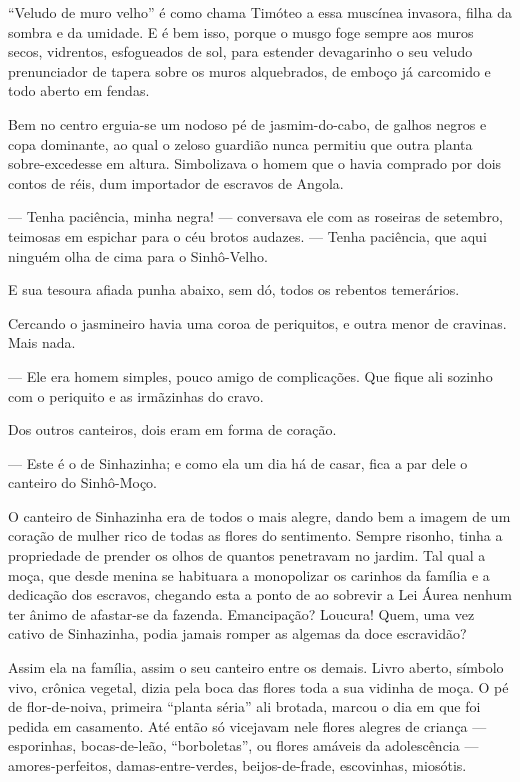 ``Veludo de muro velho'' é como chama Timóteo a essa muscínea invasora,
filha da sombra e da umidade. E é bem isso, porque o musgo foge sempre
aos muros secos, vidrentos, esfogueados de sol, para estender
devagarinho o seu veludo prenunciador de tapera sobre os muros
alquebrados, de emboço já carcomido e todo aberto em fendas.

Bem no centro erguia-se um nodoso pé de jasmim-do-cabo, de galhos negros
e copa dominante, ao qual o zeloso guardião nunca permitiu que outra
planta sobre-excedesse em altura. Simbolizava o homem que o havia
comprado por dois contos de réis, dum importador de escravos de Angola.

--- Tenha paciência, minha negra! --- conversava ele com as roseiras de
setembro, teimosas em espichar para o céu brotos audazes. --- Tenha
paciência, que aqui ninguém olha de cima para o Sinhô-Velho.

E sua tesoura afiada punha abaixo, sem dó, todos os rebentos temerários.

Cercando o jasmineiro havia uma coroa de periquitos, e outra menor de
cravinas. Mais nada.

--- Ele era homem simples, pouco amigo de complicações. Que fique ali
sozinho com o periquito e as irmãzinhas do cravo.

Dos outros canteiros, dois eram em forma de coração.

--- Este é o de Sinhazinha; e como ela um dia há de casar, fica a par
dele o canteiro do Sinhô-Moço.

O canteiro de Sinhazinha era de todos o mais alegre, dando bem a imagem
de um coração de mulher rico de todas as flores do sentimento. Sempre
risonho, tinha a propriedade de prender os olhos de quantos penetravam
no jardim. Tal qual a moça, que desde menina se habituara a monopolizar
os carinhos da família e a dedicação dos escravos, chegando esta a ponto
de ao sobrevir a Lei Áurea nenhum ter ânimo de afastar-se da fazenda.
Emancipação? Loucura! Quem, uma vez cativo de Sinhazinha, podia jamais
romper as algemas da doce escravidão?

Assim ela na família, assim o seu canteiro entre os demais. Livro
aberto, símbolo vivo, crônica vegetal, dizia pela boca das flores toda a
sua vidinha de moça. O pé de flor-de-noiva, primeira ``planta séria''
ali brotada, marcou o dia em que foi pedida em casamento. Até então só
vicejavam nele flores alegres de criança --- esporinhas, bocas-de-leão,
``borboletas'', ou flores amáveis da adolescência --- amores-perfeitos,
damas-entre-verdes, beijos-de-frade, escovinhas, miosótis.

